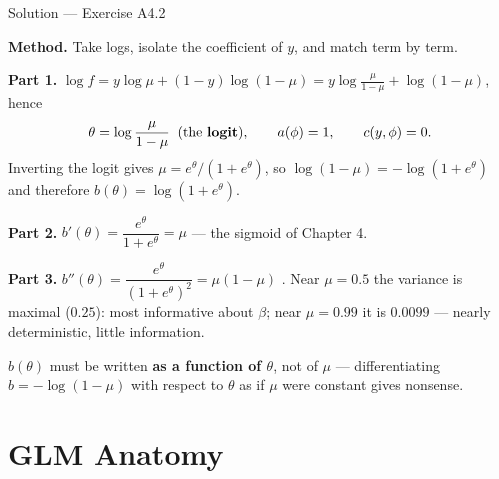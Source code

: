 \documentclass[aspectratio=169,11pt]{beamer}
\begin{document}
\begin{frame}{Solution --- Exercise A4.2}
\begin{solutionbox}
  \textbf{Method.} Take logs, isolate the coefficient of $y$, and match term by term.

  \textbf{Part 1.}
  $\log f = y\log\mu + (1-y)\log(1-\mu)
          = y\log\frac{\mu}{1-\mu} + \log(1-\mu)$, hence
  \[
    \theta = \log\frac{\mu}{1-\mu} \;\;(\text{the \textbf{logit}}), \qquad
    a(\phi)=1, \qquad c(y,\phi)=0 .
  \]
  Inverting the logit gives $\mu = e^{\theta}/(1+e^{\theta})$, so
  $\log(1-\mu) = -\log(1+e^{\theta})$ and therefore
  $b(\theta) = \log(1+e^{\theta})$.

  \textbf{Part 2.} $b'(\theta) = \dfrac{e^{\theta}}{1+e^{\theta}} = \mu$ \checkmark ---
  the sigmoid of Chapter 4.

  \textbf{Part 3.} $b''(\theta) = \dfrac{e^{\theta}}{(1+e^{\theta})^2}
  = \mu(1-\mu)$ \checkmark. Near $\mu=0.5$ the variance is maximal ($0.25$): most
  informative about $\beta$; near $\mu = 0.99$ it is $0.0099$ --- nearly
  deterministic, little information.
\end{solutionbox}
\begin{mistake}
  $b(\theta)$ must be written \textbf{as a function of $\theta$}, not of $\mu$ ---
  differentiating $b = -\log(1-\mu)$ with respect to $\theta$ as if $\mu$ were
  constant gives nonsense.
\end{mistake}
\end{frame}

\section{GLM Anatomy}
\end{document}
